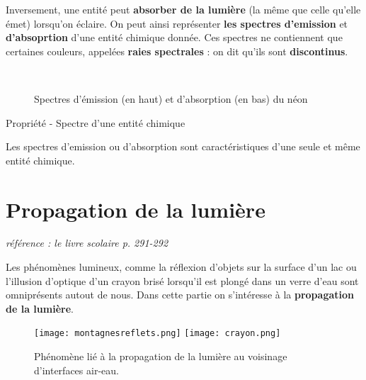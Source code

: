 \documentclass[french, a4paper, 12pt]{article}
\begin{document}
Inversement, une entité peut \textbf{absorber de la lumière} (la même que celle qu'elle émet) lorsqu'on éclaire. On peut ainsi représenter \textbf{les spectres d'emission} et \textbf{d'absoprtion} d'une entité chimique donnée. Ces spectres ne contiennent que certaines couleurs, appelées \textbf{raies spectrales} : on dit qu'ils sont \textbf{discontinus}.


\begin{figure}[ht]
	\centering
	\pgfspectra[element = Ne, width=.9\textwidth, height = 2cm]\\%

	\pgfspectra[element = Ne, absorption, width=.9\textwidth, height = 2cm, axis,axis step = 20, begin = 380, end = 780,axis font= \footnotesize, axis color=black!0, axis font color=black,axis label text ={$\lambda$ (nm)}]%
	\caption{Spectres d'émission (en haut) et d'absorption (en bas) du néon }
\end{figure}

\begin{Proposition}{Propriété - Spectre d'une entité chimique}

	Les spectres d'emission ou d'absorption sont caractéristiques d'une seule et même entité chimique. 



\end{Proposition}

\clearpage
\section{Propagation de la lumière}

\begin{center}
	\textit{référence : le livre scolaire p. 291-292}
\end{center}

Les phénomènes lumineux, comme la réflexion d'objets sur la surface d'un lac ou l'illusion d'optique d'un crayon brisé lorsqu'il est plongé dans un verre d'eau sont omniprésents autout de nous. Dans cette partie on s'intéresse à la \textbf{propagation de la lumière}. 

\begin{figure}[ht]
	\centering
	\texttt{[image: montagnesreflets.png]}\hspace{2.5cm}
	\texttt{[image: crayon.png]}
	\caption{Phénomène lié à la propagation de la lumière au voisinage d'interfaces air-eau.}
\end{figure}
\end{document}
